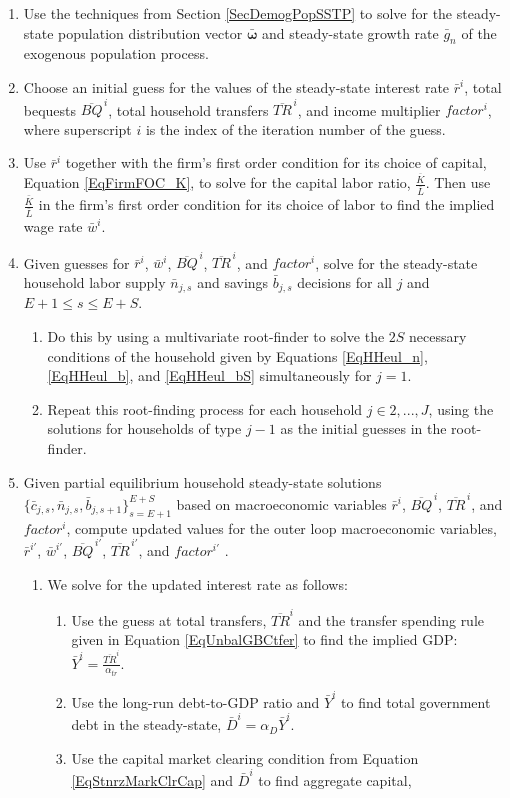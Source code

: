   \begin{enumerate}
    \item Use the techniques from Section \ref{SecDemogPopSSTP} to solve for the steady-state population distribution vector $\bm{\bar{\omega}}$ and steady-state growth rate $\bar{g}_n$ of the exogenous population process.
    \item Choose an initial guess for the values of the steady-state interest rate $\bar{r}^i$, total bequests $\overline{BQ}^{\,i}$, total household transfers $\overline{TR}^{\,i}$, and income multiplier $factor^i$, where superscript $i$ is the index of the iteration number of the guess.
    \item Use $\bar{r}^i$ together with the firm's first order condition for its choice of capital, Equation \ref{EqFirmFOC_K}, to solve for the capital labor ratio, $\frac{\overline{K}}{\overline{L}}$.  Then use $\frac{\bar{K}}{\bar{L}}$ in the firm's first order condition for its choice of labor to find the implied wage rate $\bar{w}^i$.
    \item Given guesses for $\bar{r}^i$, $\bar{w}^i$, $\overline{BQ}^{\,i}$, $\overline{TR}^{\,i}$, and $factor^i$, solve for the steady-state household labor supply $\bar{n}_{j,s}$ and savings $\bar{b}_{j,s}$ decisions for all $j$ and $E+1\leq s\leq E+S$.
    \begin{enumerate}
      \item Do this by using a multivariate root-finder to solve the $2S$ necessary conditions of the household given by Equations \ref{EqHHeul_n}, \eqref{EqHHeul_b}, and \eqref{EqHHeul_bS} simultaneously for $j=1$.
      \item Repeat this root-finding process for each household $j\in{2,...,J}$, using the solutions for households of type $j-1$ as the initial guesses in the root-finder.
   \end{enumerate}
    \item Given partial equilibrium household steady-state solutions $\{\bar{c}_{j,s},\bar{n}_{j,s},\bar{b}_{j,s+1}\}_{s=E+1}^{E+S}$ based on macroeconomic variables $\bar{r}^i$, $\overline{BQ}^{\,i}$, $\overline{TR}^{\,i}$, and $factor^i$, compute updated values for the outer loop macroeconomic variables, $\bar{r}^{i'}$, $\bar{w}^{i'}$, $\overline{BQ}^{\,i'}$, $\overline{TR}^{\,i'}$, and $factor^{i'}$ .
    \begin{enumerate}
      \item We solve for the updated interest rate as follows:
      	\begin{enumerate}
      		\item Use the guess at total transfers, $\overline{TR}^{i}$ and the transfer spending rule given in Equation \eqref{EqUnbalGBCtfer} to find the implied GDP: $\bar{Y}^{i} = \frac{\overline{TR}^{i}}{\alpha_{tr}}$.
      		\item Use the long-run debt-to-GDP ratio and $\bar{Y}^{i}$ to find total government debt in the steady-state, $\bar{D}^{i} = \alpha_{D}\bar{Y}^{i}$.
      		\item Use the capital market clearing condition from Equation \eqref{EqStnrzMarkClrCap} and $\bar{D}^{i}$ to find aggregate capital,


\end{enumerate}
\end{enumerate}
\end{enumerate}
